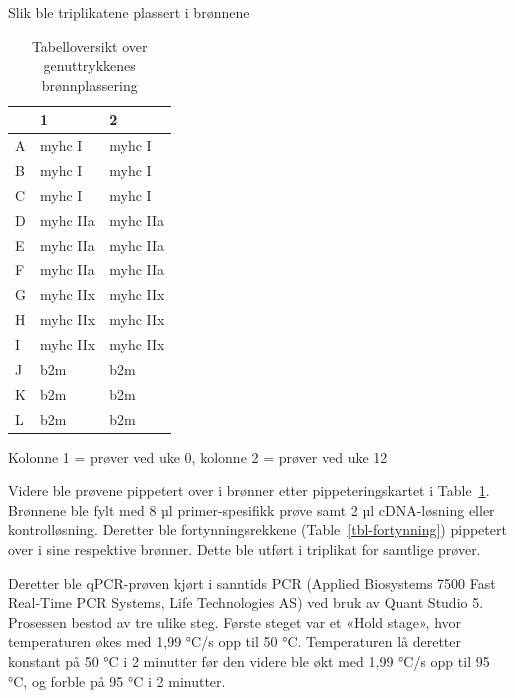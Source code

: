 \documentclass[
  letterpaper,
  DIV=11,
  numbers=noendperiod]{scrreprt}
\begin{document}
\begin{minipage}{\linewidth}
Slik ble triplikatene plassert i brønnene\\
\end{minipage}
\endgroup

\begingroup
\fontsize{12.0pt}{14.4pt}\selectfont
\setlength{\LTpost}{0mm}

\begin{longtable}{lll}

\caption{\label{tbl-gener}Tabelloversikt over genuttrykkenes
brønnplassering}

\tabularnewline

\toprule
 & 1 & 2 \\ 
\midrule\addlinespace[2.5pt]
A & myhc I & myhc I \\ 
B & myhc I & myhc I \\ 
C & myhc I & myhc I \\ 
D & myhc IIa & myhc IIa \\ 
E & myhc IIa & myhc IIa \\ 
F & myhc IIa & myhc IIa \\ 
G & myhc IIx & myhc IIx \\ 
H & myhc IIx & myhc IIx \\ 
I & myhc IIx & myhc IIx \\ 
J & b2m & b2m \\ 
K & b2m & b2m \\ 
L & b2m & b2m \\ 
\bottomrule

\end{longtable}

\begin{minipage}{\linewidth}
Kolonne 1 = prøver ved uke 0, kolonne 2 = prøver ved uke 12\\
\end{minipage}
\endgroup

Videre ble prøvene pippetert over i brønner etter pippeteringskartet i
Table~\ref{tbl-gener}. Brønnene ble fylt med 8 µl primer-spesifikk prøve
samt 2 µl cDNA-løsning eller kontrolløsning. Deretter ble
fortynningsrekkene (Table~\ref{tbl-fortynning}) pippetert over i sine
respektive brønner. Dette ble utført i triplikat for samtlige prøver.

Deretter ble qPCR-prøven kjørt i sanntids PCR (Applied Biosystems 7500
Fast Real-Time PCR Systems, Life Technologies AS) ved bruk av Quant
Studio 5. Prosessen bestod av tre ulike steg. Første steget var et «Hold
stage», hvor temperaturen økes med 1,99 °C/s opp til 50 °C. Temperaturen
lå deretter konstant på 50 °C i 2 minutter før den videre ble økt med
1,99 °C/s opp til 95 °C, og forble på 95 °C i 2 minutter.
\end{document}
